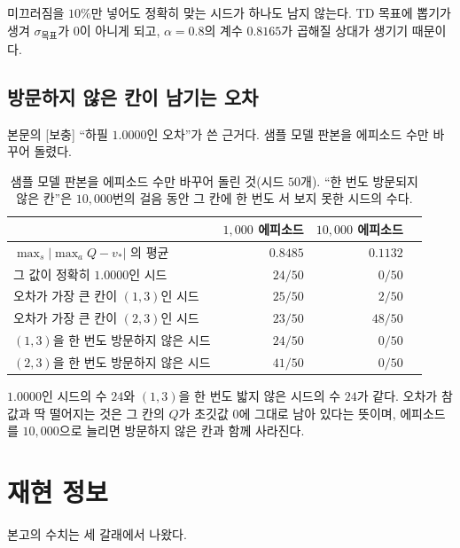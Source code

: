 \documentclass[11pt,a4paper]{article}
\begin{document}
미끄러짐을 $10\%$만 넣어도 정확히 맞는 시드가 하나도 남지 않는다. TD 목표에 뽑기가 생겨
$\sigma_{\text{목표}}$가 $0$이 아니게 되고, $\alpha=0.8$의 계수 $0.8165$가 곱해질 상대가 생기기
때문이다.

\subsection{방문하지 않은 칸이 남기는 오차}
\label{app:exact-one}

본문의 [보충] ``하필 $1.0000$인 오차''가 쓴 근거다. 샘플 모델 판본을 에피소드 수만 바꾸어 돌렸다.

\begin{table}[htbp]
\centering
\caption{샘플 모델 판본을 에피소드 수만 바꾸어 돌린 것(시드 $50$개). ``한 번도 방문되지 않은 칸''은
$10{,}000$번의 걸음 동안 그 칸에 한 번도 서 보지 못한 시드의 수다.}
\label{tab:untouched}
\small
\begin{tabular}{@{}lrrr@{}}
\toprule
 & $1{,}000$ 에피소드 & $10{,}000$ 에피소드 \\
\midrule
$\max_s|\max_a Q - v_*|$ 의 평균        & $0.8485$ & $0.1132$ \\
그 값이 정확히 $1.0000$인 시드          & $24/50$  & $0/50$ \\
오차가 가장 큰 칸이 $(1,3)$인 시드      & $25/50$  & $2/50$ \\
오차가 가장 큰 칸이 $(2,3)$인 시드      & $23/50$  & $48/50$ \\
$(1,3)$을 한 번도 방문하지 않은 시드    & $24/50$  & $0/50$ \\
$(2,3)$을 한 번도 방문하지 않은 시드    & $41/50$  & $0/50$ \\
\bottomrule
\end{tabular}
\end{table}

$1.0000$인 시드의 수 $24$와 $(1,3)$을 한 번도 밟지 않은 시드의 수 $24$가 같다. 오차가 참값과 딱
떨어지는 것은 그 칸의 $Q$가 초깃값 $0$에 그대로 남아 있다는 뜻이며, 에피소드를 $10{,}000$으로
늘리면 방문하지 않은 칸과 함께 사라진다.

\section*{재현 정보}

본고의 수치는 세 갈래에서 나왔다.
\end{document}
